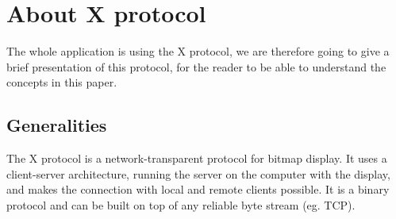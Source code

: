 \section{About X protocol}
The whole application is using the X protocol, we are therefore going
to give a brief presentation of this protocol, for the reader to be able 
to understand the concepts in this paper.
\subsection{Generalities}
The X protocol is a network-transparent protocol for bitmap display. 
It uses a client-server architecture, running the server on the computer 
with the display, and makes the connection with local and remote clients possible. 
It is a binary protocol and can be built on top of any reliable byte stream (eg. TCP).
